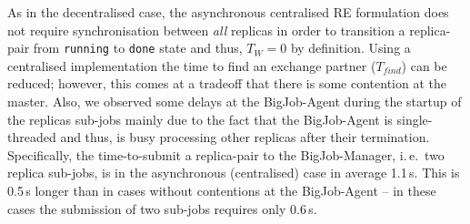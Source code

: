 \documentclass{rspublic}
\newcommand{\jhanote}[1]{ {\textcolor{red} { ***shantenu: #1 }}}
\newcommand{\alnote}[1]{ {\textcolor{blue} { ***andre: #1 }}}
\newcommand{\athotanote}[1]{ {\textcolor{green} { ***athota: #1 }}}
\newcommand{\alnote}[1]{}
\newcommand{\athotanote}[1]{}
\newcommand{\jhanote}[1]{}
\begin{document}
As in the decentralised case, the asynchronous centralised RE
formulation does not require synchronisation between {\it all} replicas
in order to transition a replica-pair from \texttt{run\-ning} to
\texttt{done} state and thus, $T_W = 0$ by definition. Using a centralised
implementation the time to find an exchange partner ($T_{find}$) can be
reduced; however, this comes at a tradeoff that there is some
contention at the master. Also, we observed some delays at the BigJob-Agent 
during the startup of the replicas sub-jobs mainly due to the
fact that the BigJob-Agent is single-threaded and thus, is busy
processing other replicas after their termination.  Specifically, the
time-to-submit a replica-pair to the BigJob-Manager, 
i.\,e.\ two replica sub-jobs, is in the asynchronous (centralised) case 
in average 1.1\,s. This is 0.5\,s longer than in cases
without contentions at the BigJob-Agent -- in these cases the submission
of two sub-jobs requires only 0.6\,s.
\end{document}
